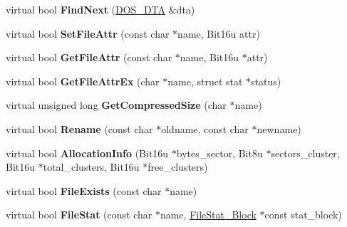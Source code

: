 \begin{DoxyCompactItemize}
\item 
\hypertarget{classisoDrive_ae425a68d6332c3f1fc1a463c42cc2d0d}{virtual bool {\bfseries Find\-Next} (\hyperlink{classDOS__DTA}{D\-O\-S\-\_\-\-D\-T\-A} \&dta)}\label{classisoDrive_ae425a68d6332c3f1fc1a463c42cc2d0d}

\item 
\hypertarget{classisoDrive_ac5123faeebedadd61fbc9ea338b816b4}{virtual bool {\bfseries Set\-File\-Attr} (const char $\ast$name, Bit16u attr)}\label{classisoDrive_ac5123faeebedadd61fbc9ea338b816b4}

\item 
\hypertarget{classisoDrive_ace6b70797ab4d3950d5587f5539d5691}{virtual bool {\bfseries Get\-File\-Attr} (const char $\ast$name, Bit16u $\ast$attr)}\label{classisoDrive_ace6b70797ab4d3950d5587f5539d5691}

\item 
\hypertarget{classisoDrive_a556534c3301e4b0a8f4a94265887faed}{virtual bool {\bfseries Get\-File\-Attr\-Ex} (char $\ast$name, struct stat $\ast$status)}\label{classisoDrive_a556534c3301e4b0a8f4a94265887faed}

\item 
\hypertarget{classisoDrive_a5e53b3491aa8f86eee61140d76818361}{virtual unsigned long {\bfseries Get\-Compressed\-Size} (char $\ast$name)}\label{classisoDrive_a5e53b3491aa8f86eee61140d76818361}

\item 
\hypertarget{classisoDrive_aa5f2e9221e3a3b6640c4473cf576121f}{virtual bool {\bfseries Rename} (const char $\ast$oldname, const char $\ast$newname)}\label{classisoDrive_aa5f2e9221e3a3b6640c4473cf576121f}

\item 
\hypertarget{classisoDrive_aaf6eb6eab4a4efb021a207f99d14c3e2}{virtual bool {\bfseries Allocation\-Info} (Bit16u $\ast$bytes\-\_\-sector, Bit8u $\ast$sectors\-\_\-cluster, Bit16u $\ast$total\-\_\-clusters, Bit16u $\ast$free\-\_\-clusters)}\label{classisoDrive_aaf6eb6eab4a4efb021a207f99d14c3e2}

\item 
\hypertarget{classisoDrive_a7b7b691f5e6d00978aaf23e50531094c}{virtual bool {\bfseries File\-Exists} (const char $\ast$name)}\label{classisoDrive_a7b7b691f5e6d00978aaf23e50531094c}

\item 
\hypertarget{classisoDrive_a8f1b1e00cc89546093bcc04fa52ae40c}{virtual bool {\bfseries File\-Stat} (const char $\ast$name, \hyperlink{structFileStat__Block}{File\-Stat\-\_\-\-Block} $\ast$const stat\-\_\-block)}\label{classisoDrive_a8f1b1e00cc89546093bcc04fa52ae40c}


\end{DoxyCompactItemize}
